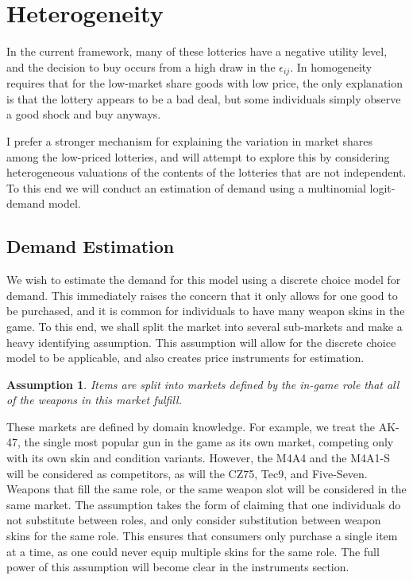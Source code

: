 \documentclass[12pt]{paper}
\newtheorem{assume}{Assumption}
\begin{document}
\section{Heterogeneity}

In the current framework, many of these lotteries have a
negative utility level, and the decision to buy occurs from a high draw
in the $\epsilon_{ij}$. In homogeneity requires that for the low-market share
goods with low price, the only explanation is that the lottery appears
to be a bad deal, but some individuals simply observe a good shock and
buy anyways.

I prefer a stronger mechanism for explaining the variation in
market shares among the low-priced lotteries, and will attempt to
explore this by considering heterogeneous valuations of the contents
of the lotteries that are not independent. To this end we will conduct
an estimation of demand using a multinomial logit-demand model. 






 \subsection{Demand Estimation}

We wish to estimate the demand for this model using a discrete choice
model for demand. This immediately raises the concern that it only
allows for one good to be purchased, and it is common for individuals
to have many weapon skins in the game. To this end, we shall split the
market into several sub-markets and make a heavy identifying
assumption. This assumption will allow for the discrete choice model
to be applicable, and also creates price instruments for estimation.

\begin{assume}
  Items are split into markets defined by the in-game role that all of
  the weapons in this market fulfill.
\end{assume}

These markets are defined by domain knowledge. For example, we treat
the AK-47, the single most popular gun in the game as its own market,
competing only with its own skin and condition variants. However, the
M4A4 and the M4A1-S will be considered as competitors, as will the
CZ75, Tec9, and Five-Seven. Weapons that fill the same role, or the
same weapon slot will be considered in the same market. The assumption
takes the form of claiming that one individuals do not substitute
between roles, and only consider substitution between weapon skins for
the same role. This ensures that consumers only purchase a single item
at a time, as one could never equip multiple skins for the same
role. The full power of this assumption will become clear in the
instruments section.
\end{document}
